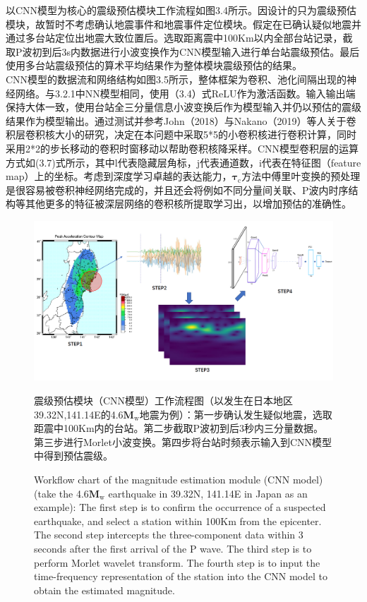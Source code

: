 \indent 以CNN模型为核心的震级预估模块工作流程如图3.4所示。因设计的只为震级预估模块，故暂时不考虑确认地震事件和地震事件定位模块。假定在已确认疑似地震并通过多台站定位出地震大致位置后。选取距离震中100Km以内全部台站记录，截取P波初到后3s内数据进行小波变换作为CNN模型输入进行单台站震级预估。最后使用多台站震级预估的算术平均结果作为整体模块震级预估的结果。\\
\indent CNN模型的数据流和网络结构如图3.5所示，整体框架为卷积、池化间隔出现的神经网络。与3.2.1中NN模型相同，使用（3.4）式ReLU作为激活函数。输入输出端保持大体一致，使用台站全三分量信息小波变换后作为模型输入并仍以预估的震级结果作为模型输出。通过测试并参考John（2018）与Nakano（2019）等人关于卷积层卷积核大小的研究，决定在本问题中采取5*5的小卷积核进行卷积计算，同时采用2*2的步长移动的卷积时窗移动以帮助卷积核降采样。CNN模型卷积层的运算方式如(3.7)式所示，其中l代表隐藏层角标，j代表通道数，i代表在特征图（feature map）上的坐标。考虑到深度学习卓越的表达能力，$\mathbf{\tau}_{\mathrm{c}}$方法中傅里叶变换的预处理是很容易被卷积神经网络完成的，并且还会将例如不同分量间关联、P波内时序结构等其他更多的特征被深层网络的卷积核所提取学习出，以增加预估的准确性。\\
\begin{figure}[h] 
\centering 
 \includegraphics[width=1.0\linewidth]{img/Flow.jpg} 
 \renewcommand{\figurename}{图} 
\caption{震级预估模块（CNN模型）工作流程图（以发生在日本地区39.32N,141.14E的4.6$\mathbf{M}_{\mathrm{w}}$地震为例）：第一步确认发生疑似地震，选取距震中100Km内的台站。第二步截取P波初到后3秒内三分量数据。第三步进行Morlet小波变换。第四步将台站时频表示输入到CNN模型中得到预估震级。} 
\addtocounter{figure}{-1} \vspace{-5pt} 
\renewcommand{\figurename}{Fig} 
\caption{Workflow chart of the magnitude estimation module (CNN model) (take the 4.6$\mathbf{M}_{\mathrm{w}}$ earthquake in 39.32N, 141.14E in Japan as an example): The first step is to confirm the occurrence of a suspected earthquake, and select a station within 100Km from the epicenter. The second step intercepts the three-component data within 3 seconds after the first arrival of the P wave. The third step is to perform Morlet wavelet transform. The fourth step is to input the time-frequency representation of the station into the CNN model to obtain the estimated magnitude.} 
\renewcommand{\figurename}{图} 
\label{fig:network-device-influence.png} 
\end{figure}
